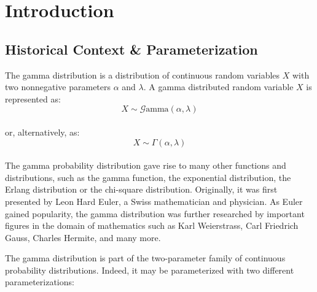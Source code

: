 \documentclass[12pt]{article}
\newcommand{\G}{\mathcal{G}}
\begin{document}
\singlespacing

\tableofcontents\pagebreak
\doublespacing
\section{Introduction}\vspace*{-24pt}
\subsection{Historical Context \& Parameterization}
The gamma distribution\cite{carrierProbabilityStatistics201BNM05} is a distribution of continuous random variables $X$
with two nonnegative parameters $\alpha$ and $\lambda$. A gamma distributed random variable $X$ is represented as:
\vspace*{-24pt}
\begin{equation*}
	X\sim\G\text{amma}(\alpha, \lambda)
\end{equation*}\\[-40pt]
or, alternatively, as:\vspace*{-6pt}
\begin{equation*}
	X\sim\Gamma(\alpha,\lambda)
\end{equation*}\\[-60pt]

The gamma probability distribution gave rise to many other functions and distributions, such as the gamma function, the
exponential distribution, the Erlang distribution or the chi-square distribution. Originally, it was first presented by
Leon Hard Euler, a Swiss mathematician and physician. As Euler gained popularity, the gamma distribution was further
researched by important figures in the domain of mathematics such as Karl Weierstrass, Carl Friedrich Gauss, Charles
Hermite, and many more\cite{hoschGammaDistribution2017, wikipediaGammaDistribution2022,
sebahIntroductionGammaFunction2002}.

The gamma distribution is part of the two-parameter family of continuous probability distributions. Indeed, it may be
parameterized with two different parameterizations\cite{wikipediaGammaDistribution2022}:
\end{document}
